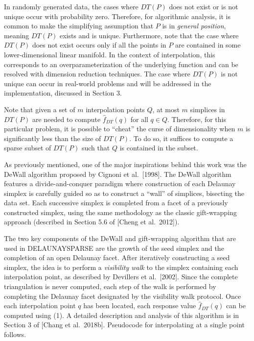 {\enspace
In randomly generated data, the cases where $DT(P)$ does not exist
or is not unique occur with probability zero. Therefore, for
algorithmic analysis, it is common to make the simplifying assumption
that $P$ is in {\it general position}, meaning $DT(P)$ exists and is
unique. Furthermore, note that the case where $DT(P)$ does not exist
occurs only if all the points in $P$ are contained in some 
lower-dimensional linear manifold. In the context of interpolation,
this corresponds to an overparameterization of the underlying function
and can be resolved with dimension reduction techniques.
The case where $DT(P)$ is not unique can occur in real-world problems
and will be addressed in the implementation, discussed in Section 3.
\medskip

Note that given a set of $m$ interpolation points $Q$, at most $m$
simplices in $DT(P)$ are needed to compute ${\hat f}_{DT}(q)$ for
all $q\in Q$. Therefore, for this particular problem, it is possible
to ``cheat'' the curse of dimensionality when $m$ is significantly
less than the size of $DT(P)$. To do so, it suffices to compute
a sparse subset of $DT(P)$ such that $Q$ is contained in the subset.

As previously mentioned, one of the major inspirations behind this
work was the DeWall algorithm proposed by Cignoni et al.\ [1998].
The DeWall algorithm features a divide-and-conquer paradigm where
construction of each Delaunay simplex is carefully guided so as to
construct a ``wall'' of simplices, bisecting the data set. Each
successive simplex is completed from a facet of a previously constructed
simplex, using the same methodology as the classic gift-wrapping
approach (described in Section 5.6 of [Cheng et al.\ 2012]).

The two key components of the DeWall and gift-wrapping algorithm
that are used in DELAUNAYSPARSE are the growth of the seed simplex
and the completion of an open Delaunay facet. After iteratively
constructing a seed simplex, the idea is to perform a 
{\it visibility walk} to the simplex containing each interpolation
point, as described by Devillers et al.\ [2002]. Since the complete
triangulation is never computed, each step of the walk is performed by
completing the Delaunay facet designated by the visibility walk protocol.
Once each interpolation point $q$ has been located, each response value
${\hat f}_{DT}(q)$ can be computed using (1). A detailed description
and analysis of this algorithm is in Section 3 of [Chang et al.\ 2018b].
Pseudocode for interpolating at a single point follows.

}
